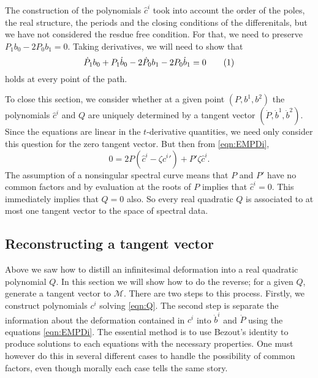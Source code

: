The construction of the polynomials $\hat{c}^i$ took into account the order of the poles, the real structure, the periods and the closing conditions of the differenitals, but we have not considered the resdue free condition. For that, we need to preserve $P_1b_0 - 2P_0b_1 = 0$. Taking derivatives, we will need to show that
\[
\dot{P}_1 b_0 + P_1 \dot{b}_0 - 2 \dot{P}_0 b_1 - 2 P_0 \dot{b}_1 = 0 \labelthis{eq:residueTangent}
\]
holds at every point of the path.

To close this section, we consider whether at a given point $(P,b^1,b^2)$ the polynomials $\hat{c}^i$ and $Q$ are uniquely determined by a tangent vector $(\dot P, \dot b^1, \dot b^2)$. Since the equations are linear in the $t$-derivative quantities, we need only consider this question for the zero tangent vector. But then from \eqref{eqn:EMPDi},
\[
0 = 2P\left( \hat c^i - \zeta\hat {c^i}'\right) + P'\zeta\hat c^i.
\]
The assumption of a nonsingular spectral curve means that $P$ and $P'$ have no common factors and by evaluation at the roots of $P$ implies that $\hat c^i=0$. This immediately implies that $Q=0$ also. So every real quadratic $Q$ is associated to at most one tangent vector to the space of spectral data.













\subsection{Reconstructing a tangent vector}
Above we saw how to distill an infinitesimal deformation into a real quadratic polynomial $Q$. In this section we will show how to do the reverse; for a given $Q$, generate a tangent vector to $\mathcal{M}$. There are two steps to this process. Firstly, we construct polynomials $c^i$ solving \eqref{eqn:Q}. The second step is separate the information about the deformation contained in $c^i$ into $\dot{b}^i$ and $\dot{P}$ using the equations \eqref{eqn:EMPDi}. The essential method is to use Bezout's identity to produce solutions to each equations with the necessary properties. One must however do this in several different cases to handle the possibility of common factors, even though morally each case tells the same story.

